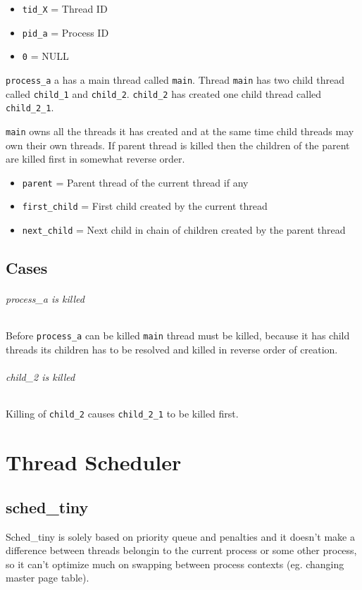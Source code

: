 \begin{itemize}
  \item \verb+tid_X+ = Thread ID
  \item \verb+pid_a+ = Process ID
  \item \verb+0+ = NULL
\end{itemize}

\verb+process_a+ a has a main thread called \verb+main+. Thread
\verb+main+ has two child thread called \verb+child_1+ and \verb+child_2+.
\verb+child_2+ has created one child thread called \verb+child_2_1+.

\verb+main+ owns all the threads it has created and at the same time child
threads may own their own threads. If parent thread is killed then the
children of the parent are killed first in somewhat reverse order.

\begin{itemize}
  \item \verb+parent+ = Parent thread of the current thread if any
  \item \verb+first_child+ = First child created by the current thread
  \item \verb+next_child+ = Next child in chain of children created by the
        parent thread
\end{itemize}

\section{Cases}
\subparagraph*{process\_a is killed}

Before \verb+process_a+ can be killed \verb+main+ thread must be killed,
because it has child threads its children has to be resolved and killed in
reverse order of creation.

\subparagraph*{child\_2 is killed}

Killing of \verb+child_2+ causes \verb+child_2_1+ to be killed first.


\chapter{Thread Scheduler}

\section{sched\_tiny}

Sched\_tiny is solely based on priority queue and penalties and it doesn't make
a difference between threads belongin to the current process or some other
process, so it can't optimize much on swapping between process contexts
(eg. changing master page table).

